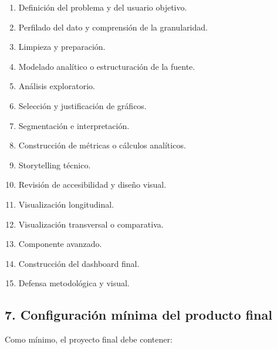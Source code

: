 \documentclass[
]{article}
\providecommand{\tightlist}{%
  \setlength{\itemsep}{0pt}\setlength{\parskip}{0pt}}
\begin{document}
\begin{enumerate}
\def\labelenumi{\arabic{enumi}.}
\tightlist
\item
  Definición del problema y del usuario objetivo.
\item
  Perfilado del dato y comprensión de la granularidad.
\item
  Limpieza y preparación.
\item
  Modelado analítico o estructuración de la fuente.
\item
  Análisis exploratorio.
\item
  Selección y justificación de gráficos.
\item
  Segmentación e interpretación.
\item
  Construcción de métricas o cálculos analíticos.
\item
  Storytelling técnico.
\item
  Revisión de accesibilidad y diseño visual.
\item
  Visualización longitudinal.
\item
  Visualización transversal o comparativa.
\item
  Componente avanzado.
\item
  Construcción del dashboard final.
\item
  Defensa metodológica y visual.
\end{enumerate}

\subsection{7. Configuración mínima del producto
final}\label{7-configuraciuxf3n-muxednima-del-producto-final}

Como mínimo, el proyecto final debe contener:
\end{document}

